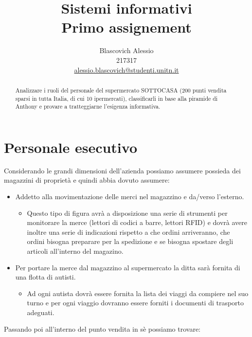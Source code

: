 \documentclass{report}
\author{Blascovich Alessio\\ 217317\\ \href{mailto:alessio.blascovich@studenti.unitn.it}{alessio.blascovich@studenti.unitn.it}}
\title{Sistemi informativi\\ Primo assignement}
\date{}
\begin{document}
   \maketitle

   \begin{abstract}
        Analizzare i ruoli del personale del supermercato SOTTOCASA (200 punti vendita sparsi in tutta Italia, di cui 10 ipermercati), classificarli in base alla piramide di Anthony e provare a tratteggiarne l'esigenza informativa.
   \end{abstract}
   
   \chapter*{Personale esecutivo}
   Considerando le grandi dimensioni dell'azienda possiamo assumere possieda dei magazzini di proprietà e quindi abbia dovuto assumere:
   \begin{itemize}
        \item Addetto alla movimentazione delle merci nel magazzino e da/verso l'esterno.
        \begin{itemize}
            \item Questo tipo di figura avrà a disposizione una serie di strumenti per monitorare la merce (lettori di codici a barre, lettori RFID) e dovrà avere inoltre una serie di indicazioni rispetto a che ordini arriveranno, che ordini bisogna preparare per la spedizione e se bisogna spostare degli articoli all'interno del magazino.
        \end{itemize}

        \item Per portare la merce dal magazzino al supermercato la ditta sarà fornita di una flotta di autisti.
        \begin{itemize}
            \item Ad ogni autista dovrà essere fornita la lista dei viaggi da compiere nel suo turno e per ogni viaggio dovranno essere forniti i documenti di trasporto adeguati.
        \end{itemize}
   \end{itemize}
   Passando poi all'interno del punto vendita in sè possiamo trovare:
\end{document}

